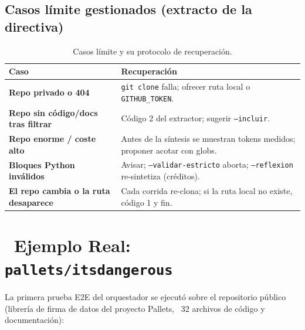 \documentclass[11pt,a4paper]{article}
\newcommand{\iconotexto}[2]{\textcolor{cyanNeon}{\faIcon{#1}}~#2}
\begin{document}
\subsection{Casos límite gestionados (extracto de la directiva)}
\begin{table}[h!]
\centering
\small
\begin{tabularx}{\linewidth}{>{\bfseries\color{azulNoche}}l >{\raggedright\arraybackslash}X}
\toprule
\rowcolor{azulNoche!12}\textbf{Caso} & \textbf{Recuperación} \\
\midrule
Repo privado o 404 & \texttt{git clone} falla; ofrecer ruta local o \texttt{GITHUB\_TOKEN}. \\
\midrule
Repo sin código/docs tras filtrar & Código 2 del extractor; sugerir \texttt{--incluir}. \\
\midrule
Repo enorme / coste alto & Antes de la síntesis se muestran tokens medidos; proponer acotar con globs. \\
\midrule
Bloques Python inválidos & Avisar; \texttt{--validar-estricto} aborta; \texttt{--reflexion} re-sintetiza (créditos). \\
\midrule
El repo cambia o la ruta desaparece & Cada corrida re-clona; si la ruta local no existe, código 1 y fin. \\
\bottomrule
\end{tabularx}
\caption{Casos límite y su protocolo de recuperación.}
\end{table}

\section{\iconotexto{flask}{Ejemplo Real: \texttt{pallets/itsdangerous}}}

La primera prueba E2E del orquestador se ejecutó sobre el repositorio público
 (librería de firma de datos del proyecto
Pallets, ~32 archivos de código y documentación):
\end{document}
